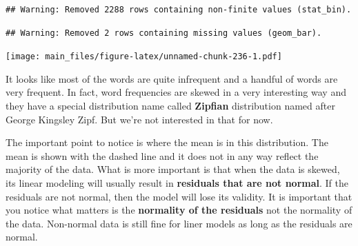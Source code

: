 \documentclass[
]{book}
\newenvironment{Shaded}{\begin{snugshade}}{\end{snugshade}}
\newcommand{\AttributeTok}[1]{\textcolor[rgb]{0.77,0.63,0.00}{#1}}
\newcommand{\DecValTok}[1]{\textcolor[rgb]{0.00,0.00,0.81}{#1}}
\newcommand{\FunctionTok}[1]{\textcolor[rgb]{0.00,0.00,0.00}{#1}}
\newcommand{\NormalTok}[1]{#1}
\newcommand{\SpecialCharTok}[1]{\textcolor[rgb]{0.00,0.00,0.00}{#1}}
\newcommand{\StringTok}[1]{\textcolor[rgb]{0.31,0.60,0.02}{#1}}
\begin{document}
\begin{Shaded}
\end{Shaded}

\begin{verbatim}
## Warning: Removed 2288 rows containing non-finite values (stat_bin).
\end{verbatim}

\begin{verbatim}
## Warning: Removed 2 rows containing missing values (geom_bar).
\end{verbatim}

\texttt{[image: main\_files/figure-latex/unnamed-chunk-236-1.pdf]}

It looks like most of the words are quite infrequent and a handful of words are very frequent. In fact, word frequencies are skewed in a very interesting way and they have a special distribution name called \textbf{Zipfian} distribution named after George Kingsley Zipf. But we're not interested in that for now.

The important point to notice is where the mean is in this distribution. The mean is shown with the dashed line and it does not in any way reflect the majority of the data. What is more important is that when the data is skewed, its linear modeling will usually result in \textbf{residuals that are not normal}. If the residuals are not normal, then the model will lose its validity. It is important that you notice what matters is the \textbf{normality of the residuals} not the normality of the data. Non-normal data is still fine for liner models as long as the residuals are normal.
\end{document}
